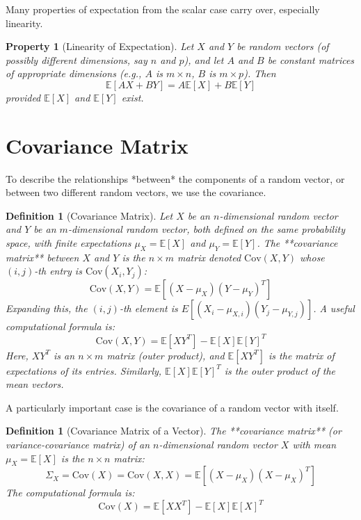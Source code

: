 \documentclass[11pt]{article}
\newtheorem{definition}[theorem]{Definition}
\newtheorem{property}[theorem]{Property}
\theoremstyle{definition} %
\newcommand{\E}{\mathbb{E}} %
\newcommand{\Cov}{\text{Cov}} %
\begin{document}
Many properties of expectation from the scalar case carry over, especially linearity.

\begin{property}[Linearity of Expectation]
Let $X$ and $Y$ be random vectors (of possibly different dimensions, say $n$ and $p$), and let $A$ and $B$ be constant matrices of appropriate dimensions (e.g., $A$ is $m \times n$, $B$ is $m \times p$). Then
\[ \E[AX + BY] = A\E[X] + B\E[Y] \]
provided $\E[X]$ and $\E[Y]$ exist.
\end{property}

\section{Covariance Matrix}

To describe the relationships *between* the components of a random vector, or between two different random vectors, we use the covariance.

\begin{definition}[Covariance Matrix]
Let $X$ be an $n$-dimensional random vector and $Y$ be an $m$-dimensional random vector, both defined on the same probability space, with finite expectations $\mu_X = \E[X]$ and $\mu_Y = \E[Y]$. The **covariance matrix** between $X$ and $Y$ is the $n \times m$ matrix denoted $\Cov(X, Y)$ whose $(i, j)$-th entry is $\Cov(X_i, Y_j)$:
\[ \Cov(X, Y) = \E[(X - \mu_X)(Y - \mu_Y)^T] \]
Expanding this, the $(i, j)$-th element is $E[(X_i - \mu_{X,i})(Y_j - \mu_{Y,j})]$.
A useful computational formula is:
\[ \Cov(X, Y) = \E[XY^T] - \E[X]\E[Y]^T \]
Here, $XY^T$ is an $n \times m$ matrix (outer product), and $\E[XY^T]$ is the matrix of expectations of its entries. Similarly, $\E[X]\E[Y]^T$ is the outer product of the mean vectors.
\end{definition}

A particularly important case is the covariance of a random vector with itself.

\begin{definition}[Covariance Matrix of a Vector]
The **covariance matrix** (or variance-covariance matrix) of an $n$-dimensional random vector $X$ with mean $\mu_X = \E[X]$ is the $n \times n$ matrix:
\[ \Sigma_X = \Cov(X) = \Cov(X, X) = \E[(X - \mu_X)(X - \mu_X)^T] \]
The computational formula is:
\[ \Cov(X) = \E[XX^T] - \E[X]\E[X]^T \]
\end{definition}
\end{document}
